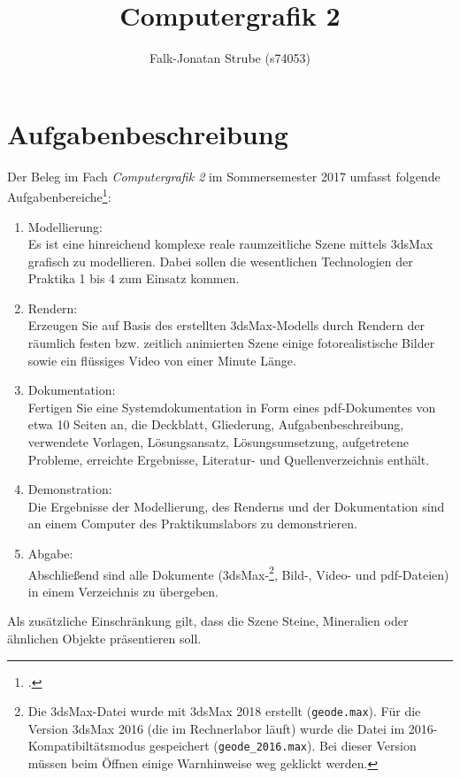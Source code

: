 \documentclass{scrreprt}
\title{Computergrafik 2}
\author{Falk-Jonatan Strube (s74053)}
\begin{document}
\maketitle
\tableofcontents

\chapter{Aufgabenbeschreibung}

Der Beleg im Fach \emph{Computergrafik 2} im Sommersemester 2017 umfasst folgende Aufgabenbereiche\footcite{Oertel2017}:
\begin{enumerate}
\item Modellierung:\label{aufg:model}\\
Es ist eine hinreichend komplexe reale raumzeitliche Szene mittels 3dsMax grafisch zu modellieren. Dabei sollen die wesentlichen Technologien der Praktika 1 bis 4 zum Einsatz kommen.
\item Rendern:\label{aufg:render}\\
Erzeugen Sie auf Basis des erstellten 3dsMax-Modells durch Rendern der räumlich festen bzw. zeitlich animierten Szene einige fotorealistische Bilder sowie ein flüssiges Video von einer Minute Länge.
\item Dokumentation:\label{aufg:doc}\\
Fertigen Sie eine Systemdokumentation in Form eines pdf-Dokumentes von etwa 10 Seiten an, die Deckblatt, Gliederung, Aufgabenbeschreibung, verwendete Vorlagen, Lösungsansatz, Lösungsumsetzung, aufgetretene Probleme, erreichte Ergebnisse, Literatur- und Quellenverzeichnis enthält.
\item Demonstration:\\
Die Ergebnisse der Modellierung, des Renderns und der Dokumentation sind an einem Computer des Praktikumslabors zu demonstrieren.
\item Abgabe:\\
Abschließend sind alle Dokumente (3dsMax-\footnote{Die 3dsMax-Datei wurde mit 3dsMax 2018 erstellt (\lstinline`geode.max`). Für die Version 3dsMax 2016 (die im Rechnerlabor läuft) wurde die Datei im 2016-Kompatibiltätsmodus gespeichert (\lstinline`geode_2016.max`). Bei dieser Version müssen beim Öffnen einige Warnhinweise weg geklickt werden.}, Bild-, Video- und pdf-Dateien) in einem Verzeichnis zu übergeben.
\end{enumerate}

Als zusätzliche Einschränkung gilt, dass die Szene Steine, Mineralien oder ähnlichen Objekte präsentieren soll.\bigskip
\end{document}
